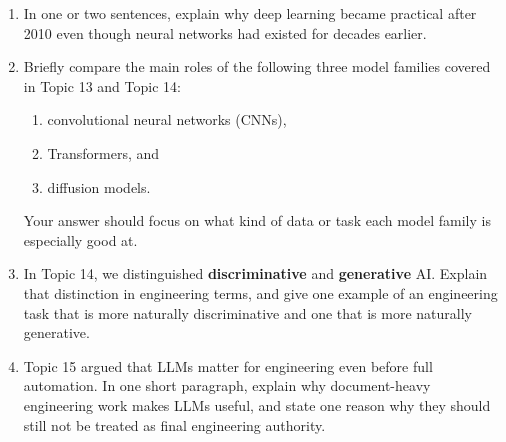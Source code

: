 \documentclass[12pt]{article}
\begin{document}
\begin{enumerate}
    \renewcommand{\labelenumi}{(\alph{enumi})}
    \item In one or two sentences, explain why deep learning became practical after 2010 even though neural networks had existed for decades earlier.

    \vspace{18pt}
    \fullunderline

    \vspace{18pt}
    \fullunderline

    \item Briefly compare the main roles of the following three model families covered in Topic 13 and Topic 14:
    \begin{enumerate}
        \renewcommand{\labelenumii}{(\roman{enumii})}
        \item convolutional neural networks (CNNs),
        \item Transformers, and
        \item diffusion models.
    \end{enumerate}
    Your answer should focus on what kind of data or task each model family is especially good at.

    \vspace{18pt}
    \fullunderline

    \vspace{18pt}
    \fullunderline

    \item In Topic 14, we distinguished \textbf{discriminative} and \textbf{generative} AI. Explain that distinction in engineering terms, and give one example of an engineering task that is more naturally discriminative and one that is more naturally generative.

    \vspace{18pt}
    \fullunderline

    \vspace{18pt}
    \fullunderline

    \item Topic 15 argued that LLMs matter for engineering even before full automation. In one short paragraph, explain why document-heavy engineering work makes LLMs useful, and state one reason why they should still not be treated as final engineering authority.

    \vspace{18pt}
    \fullunderline

    \vspace{18pt}
    \fullunderline
\end{enumerate}
\end{document}

